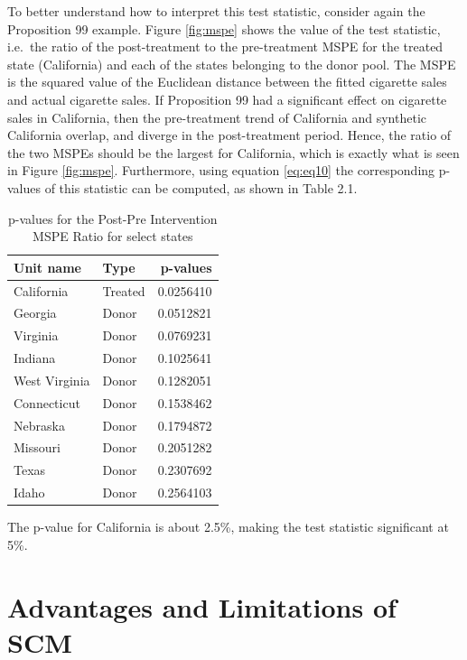 \documentclass[12pt,nobind, a4paper]{reedthesis}
\begin{document}
 To better understand how to interpret this test statistic, consider again the Proposition 99 example. Figure \ref{fig:mspe} shows the value of the test statistic, i.e.~the ratio of the post-treatment to the pre-treatment MSPE for the treated state (California) and each of the states belonging to the donor pool. The MSPE is the squared value of the Euclidean distance between the fitted cigarette sales and actual cigarette sales. If Proposition 99 had a significant effect on cigarette sales in California, then the pre-treatment trend of California and synthetic California overlap, and diverge in the post-treatment period. Hence, the ratio of the two MSPEs should be the largest for California, which is exactly what is seen in Figure \ref{fig:mspe}. Furthermore, using equation \eqref{eq:eq10} the corresponding p-values of this statistic can be computed, as shown in Table 2.1.
 \begin{table}[h!!]
 \centering
 \begin{tabular}{llr}
 \hline
 \hline
 \textbf{Unit name} & \textbf{Type}&\textbf{p-values}\\
 \hline
 \hline
 California & Treated & 0.0256410\\
 \hline
 Georgia & Donor & 0.0512821\\
 \hline
 Virginia & Donor & 0.0769231\\
 \hline
 Indiana & Donor & 0.1025641\\
 \hline
 West Virginia & Donor & 0.1282051\\
 \hline
 Connecticut & Donor & 0.1538462\\
 \hline
 Nebraska & Donor & 0.1794872\\
 \hline
 Missouri & Donor & 0.2051282\\
 \hline
 Texas & Donor & 0.2307692\\
 \hline
 Idaho & Donor & 0.2564103\\
 \hline
 \end{tabular}
 \label{tab:tab1}
 \caption{p-values for the Post-Pre Intervention MSPE Ratio for select states}
 \end{table}
 The p-value for California is about 2.5\%, making the test statistic significant at 5\%.

 \hypertarget{advantages-and-limitations-of-scm}{%
 \section{Advantages and Limitations of SCM}\label{advantages-and-limitations-of-scm}}
\end{document}
